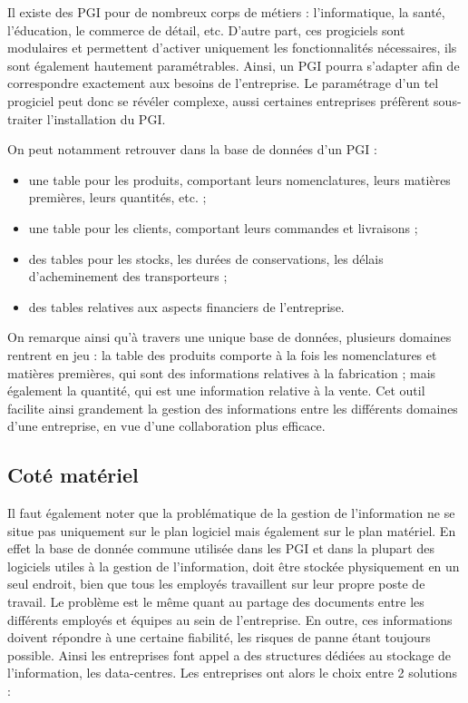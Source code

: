 Il existe des PGI pour de nombreux corps de métiers : l'informatique, la santé, l'éducation, le commerce de détail, etc. D'autre part, ces progiciels sont modulaires et permettent d'activer uniquement les fonctionnalités nécessaires, ils sont également hautement paramétrables. Ainsi, un PGI pourra s'adapter afin de correspondre exactement aux besoins de l'entreprise. Le paramétrage d'un tel progiciel peut donc se révéler complexe, aussi certaines entreprises préfèrent sous-traiter l'installation du PGI.

On peut notamment retrouver dans la base de données d'un PGI :

\begin{itemize}
\item une table pour les produits, comportant leurs nomenclatures, leurs matières premières, leurs quantités, etc. ;
\item une table pour les clients, comportant leurs commandes et livraisons ;
\item des tables pour les stocks, les durées de conservations, les délais d'acheminement des transporteurs ;
\item des tables relatives aux aspects financiers de l'entreprise.
\end{itemize}

On remarque ainsi qu'à travers une unique base de données, plusieurs domaines rentrent en jeu : la table des produits comporte à la fois les nomenclatures et matières premières, qui sont des informations relatives à la fabrication ; mais également la quantité, qui est une information relative à la vente. Cet outil facilite ainsi grandement la gestion des informations entre les différents domaines d'une entreprise, en vue d'une collaboration plus efficace.

\subsection{Coté matériel}

Il faut également noter que la problématique de la gestion de l'information ne se situe pas uniquement sur le plan logiciel mais également sur le plan matériel. En effet la base de donnée commune utilisée dans les PGI et dans la plupart des logiciels utiles à la gestion de l'information, doit être stockée physiquement en un seul endroit, bien que tous les employés travaillent sur leur propre poste de travail. Le problème est le même quant au partage des documents entre les différents employés et équipes au sein de l'entreprise. En outre, ces informations doivent répondre à une certaine fiabilité, les risques de panne étant toujours possible. Ainsi les entreprises font appel a des structures dédiées au stockage de l'information, les data-centres. Les entreprises ont alors le choix entre 2 solutions :

